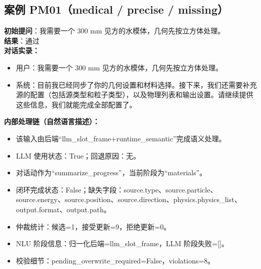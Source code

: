 \documentclass[11pt]{ctexart}
\begin{document}
\subsection{案例 PM01（medical / precise / missing）}
\textbf{初始提问}：我需要一个 300 mm 见方的水模体，几何先按立方体处理。\\
\textbf{结果}：通过\\
\textbf{对话实录：}
\begin{itemize}
\item 用户：我需要一个 300 mm 见方的水模体，几何先按立方体处理。
\item 系统：目前我已经同步了你的几何设置和材料选择。接下来，我们还需要补充源的配置（包括源类型和粒子类型），以及物理列表和输出设置。请继续提供这些信息，我们就能完成全部配置了。
\end{itemize}
\textbf{内部处理链（自然语言描述）：}
\begin{itemize}
\item 该输入由后端“llm\_slot\_frame+runtime\_semantic”完成语义处理。
\item LLM 使用状态：True；回退原因：无。
\item 对话动作为“summarize\_progress”，当前阶段为“materials”。
\item 闭环完成状态：False；缺失字段：source.type、source.particle、source.energy、source.position、source.direction、physics.physics\_list、output.format、output.path。
\item 仲裁统计：候选=1，接受更新=9，拒绝更新=0。
\item NLU 阶段信息：归一化后端=llm\_slot\_frame，LLM 阶段失败=[]。
\item 校验细节：pending\_overwrite\_required=False，violations=8。
\end{itemize}
\end{document}
